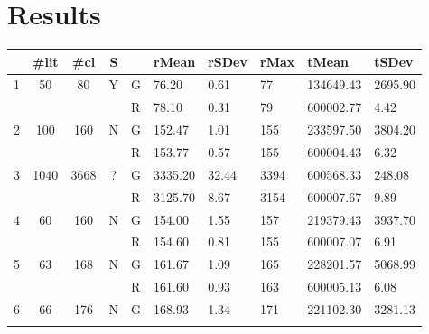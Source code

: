 \documentclass{article}
\begin{document}
\section{Results}
\begin{table}[!h]
    \setlength\tabcolsep{3pt}
    \begin{tabular}{|r|ccc|l|lll|ll|}
    \hline
                        & \#lit                 & \#cl                  & S                  &   & rMean   & rSDev & rMax & tMean     & tSDev   \\ \hline
    \multirow{2}{*}{1}  & \multirow{2}{*}{50}   & \multirow{2}{*}{80}   & \multirow{2}{*}{Y} & G & 76.20 & 0.61 & 77 & 134649.43 & 2695.90 \\  \cline{5-10}
                        &                       &                       &                    & R & 78.10   & 0.31  & 79   & 600002.77 & 4.42    \\ \hline
    \multirow{2}{*}{2}  & \multirow{2}{*}{100}  & \multirow{2}{*}{160}  & \multirow{2}{*}{N} & G & 152.47 & 1.01 & 155 & 233597.50 & 3804.20 \\ \cline{5-10} 
                        &                       &                       &                    & R & 153.77  & 0.57  & 155  & 600004.43 & 6.32    \\ \hline
    \multirow{2}{*}{3}  & \multirow{2}{*}{1040} & \multirow{2}{*}{3668} & \multirow{2}{*}{?} & G & 3335.20 & 32.44 & 3394 & 600568.33 & 248.08  \\ \cline{5-10} 
                        &                       &                       &                    & R & 3125.70 & 8.67  & 3154 & 600007.67 & 9.89    \\ \hline
    \multirow{2}{*}{4}  & \multirow{2}{*}{60}   & \multirow{2}{*}{160}  & \multirow{2}{*}{N} & G & 154.00 & 1.55 & 157 & 219379.43 & 3937.70 \\ \cline{5-10} 
                        &                       &                       &                    & R & 154.60  & 0.81  & 155  & 600007.07 & 6.91    \\ \hline
    \multirow{2}{*}{5}  & \multirow{2}{*}{63}   & \multirow{2}{*}{168}  & \multirow{2}{*}{N} & G & 161.67 & 1.09 & 165 & 228201.57 & 5068.99 \\ \cline{5-10} 
                        &                       &                       &                    & R & 161.60  & 0.93  & 163  & 600005.13 & 6.08    \\ \hline
    \multirow{2}{*}{6}  & \multirow{2}{*}{66}   & \multirow{2}{*}{176}  & \multirow{2}{*}{N} & G & 168.93 & 1.34 & 171 & 221102.30 & 3281.13 \\ \cline{5-10} 

\end{tabular}
\end{table}
\end{document}
